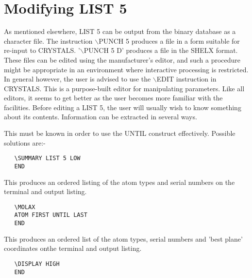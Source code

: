 \documentclass[10pt,a4paper]{report}
\begin{document}
\section{Modifying LIST 5}





As mentioned elsewhere, LIST 5 can be output from the binary database
 as a character file. The instruction $\backslash$PUNCH 5 produces a file in a form
 suitable for re-input to CRYSTALS. '$\backslash$PUNCH 5 D' produces a file in the
 SHELX format. These files can be edited using the manufacturer's editor,
 and such a procedure might be appropriate in an environment where interactive
 processing is restricted. In general however, the user is advised to use the
 $\backslash$EDIT instruction in CRYSTALS. This is a purpose-built editor for manipulating
 parameters. Like all editors, it seems to get better as the user becomes more
 familiar with the facilities.
 Before editing a LIST 5, the user will usually wish to know something about
 its contents. Information can be extracted in several ways.


\bigskip{}




This must be known in order to use the UNTIL construct effectively. Possible
 solutions are:-

\small\begin{verbatim}
   \SUMMARY LIST 5 LOW
   END
\end{verbatim}\normalsize




This produces an ordered listing of the atom types and serial numbers
 on the terminal and output listing.

\small\begin{verbatim}
   \MOLAX
   ATOM FIRST UNTIL LAST
   END
\end{verbatim}\normalsize




This produces an ordered list of the atom types, serial numbers and 
 'best plane' coordinates onthe terminal and output listing.



\bigskip{}


\small\begin{verbatim}
   \DISPLAY HIGH
   END
\end{verbatim}\normalsize
\end{document}

